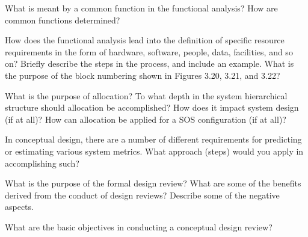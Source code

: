 \begin{exercises}
    \begin{exercise}
    \label{sea-3-19}
        What is meant by a common function in the functional analysis? How are common functions determined? 
    \end{exercise}
    \begin{solution}
    \end{solution}
    
    \begin{exercise}
    \label{sea-3-20}
        How does the functional analysis lead into the definition of specific resource requirements in the form of hardware, software, people, data, facilities, and so on? Briefly describe the steps in the process, and include an example. What is the purpose of the block numbering shown in Figures 3.20, 3.21, and 3.22?
    \end{exercise}
    \begin{solution}
    \end{solution}
    
    \begin{exercise}
    \label{sea-3-21}
        What is the purpose of allocation? To what depth in the system hierarchical structure should allocation be accomplished? How does it impact system design (if at all)? How can allocation be applied for a SOS configuration (if at all)? 
    \end{exercise}
    \begin{solution}
    \end{solution}
    
    \begin{exercise}
    \label{sea-3-22}
        In conceptual design, there are a number of different requirements for predicting or estimating various system metrics. What approach (steps) would you apply in accomplishing such?
    \end{exercise}
    \begin{solution}
    \end{solution}
    
    \begin{exercise}
    \label{sea-3-23}
        What is the purpose of the formal design review? What are some of the benefits derived from the conduct of design reviews? Describe some of the negative aspects.
    \end{exercise}
    \begin{solution}
    \end{solution}
    
    \begin{exercise}
    \label{sea-3-24}
        What are the basic objectives in conducting a conceptual design review?
    \end{exercise}
    \begin{solution}
    \end{solution}
\end{exercises}
